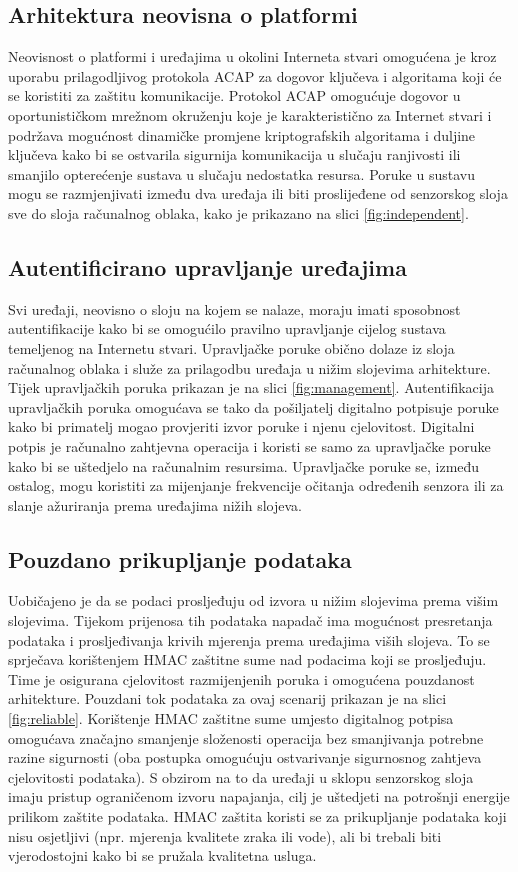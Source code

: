 \subsection{Arhitektura neovisna o platformi} 
Neovisnost o platformi i uređajima u okolini Interneta stvari omogućena
je kroz uporabu prilagodljivog protokola ACAP za dogovor ključeva i algoritama koji
će se koristiti za zaštitu komunikacije. Protokol ACAP omogućuje dogovor u
oportunističkom mrežnom okruženju koje je karakteristično za Internet stvari i
podržava mogućnost dinamičke promjene kriptografskih algoritama i duljine
ključeva kako bi se ostvarila sigurnija komunikacija u slučaju ranjivosti ili
smanjilo opterećenje sustava u slučaju nedostatka resursa. Poruke u sustavu
mogu se razmjenjivati između dva uređaja ili biti proslijeđene od senzorskog
sloja sve do sloja računalnog oblaka, kako je prikazano na slici
\ref{fig:independent}. 

\subsection{Autentificirano upravljanje uređajima}
Svi uređaji, neovisno o sloju na kojem se nalaze, moraju imati sposobnost
autentifikacije kako bi se omogućilo pravilno upravljanje cijelog sustava
temeljenog na Internetu stvari. Upravljačke poruke obično dolaze iz sloja
računalnog oblaka i služe za prilagodbu uređaja u nižim slojevima arhitekture.
Tijek upravljačkih poruka prikazan je na slici \ref{fig:management}.
Autentifikacija upravljačkih poruka omogućava se tako da pošiljatelj
digitalno potpisuje poruke kako bi primatelj mogao provjeriti izvor poruke i
njenu cjelovitost. Digitalni potpis je računalno zahtjevna operacija i koristi
se samo za upravljačke poruke kako bi se uštedjelo na računalnim resursima.
Upravljačke poruke se, između ostalog, mogu koristiti za mijenjanje frekvencije
očitanja određenih senzora ili za slanje ažuriranja prema uređajima nižih
slojeva.

\subsection{Pouzdano prikupljanje podataka}
Uobičajeno je da se podaci prosljeđuju od izvora u nižim slojevima prema višim
slojevima. Tijekom prijenosa tih podataka napadač ima mogućnost presretanja
podataka i prosljeđivanja krivih mjerenja prema uređajima viših slojeva. To se
sprječava korištenjem HMAC zaštitne sume nad podacima koji se prosljeđuju. Time
je osigurana cjelovitost razmijenjenih poruka i omogućena pouzdanost
arhitekture. Pouzdani tok podataka za ovaj scenarij prikazan je na slici
\ref{fig:reliable}. Korištenje HMAC zaštitne sume umjesto digitalnog potpisa
omogućava značajno smanjenje složenosti operacija bez smanjivanja potrebne
razine sigurnosti (oba postupka omogućuju ostvarivanje sigurnosnog zahtjeva
cjelovitosti podataka). S obzirom na to da uređaji u sklopu senzorskog sloja imaju
pristup ograničenom izvoru napajanja, cilj je uštedjeti na potrošnji energije
prilikom zaštite podataka.
HMAC zaštita koristi se za prikupljanje podataka koji nisu osjetljivi (npr.
mjerenja kvalitete zraka ili vode), ali bi trebali biti vjerodostojni kako bi se
pružala kvalitetna usluga.

